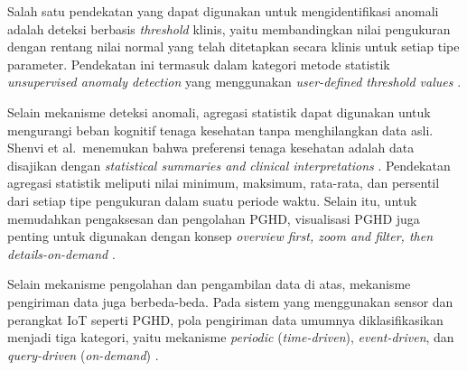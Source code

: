 Salah satu pendekatan yang dapat digunakan untuk mengidentifikasi anomali adalah deteksi berbasis \textit{threshold} klinis, yaitu membandingkan nilai pengukuran dengan rentang nilai normal yang telah ditetapkan secara klinis untuk setiap tipe parameter. 
Pendekatan ini termasuk dalam kategori metode statistik \textit{unsupervised anomaly detection} yang menggunakan \textit{user-defined threshold values} \parencite{sunny2022anomaly}.

Selain mekanisme deteksi anomali, agregasi statistik dapat digunakan untuk mengurangi beban kognitif tenaga kesehatan tanpa menghilangkan data asli. 
Shenvi et al.\ menemukan bahwa preferensi tenaga kesehatan adalah data disajikan dengan \textit{statistical summaries and clinical interpretations} \parencite{shenvi2023visualization}. 
Pendekatan agregasi statistik meliputi nilai minimum, maksimum, rata-rata, dan persentil dari setiap tipe pengukuran dalam suatu periode waktu.
Selain itu, untuk memudahkan pengaksesan dan pengolahan PGHD, visualisasi PGHD juga penting untuk digunakan dengan konsep \textit{overview first, zoom and filter, then details-on-demand} \parencite{shenvi2023visualization}. 

Selain mekanisme pengolahan dan pengambilan data di atas, mekanisme pengiriman data juga berbeda-beda.
Pada sistem yang menggunakan sensor dan perangkat IoT seperti PGHD, pola pengiriman data umumnya diklasifikasikan menjadi tiga kategori, yaitu mekanisme \textit{periodic} (\textit{time-driven}), \textit{event-driven}, dan \textit{query-driven} (\textit{on-demand}) \parencite{Akyildiz_Vuran_2010_WSN_Algorithms}.

